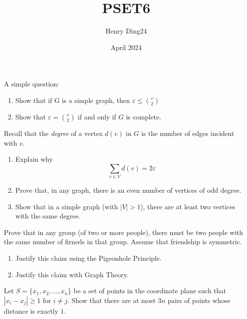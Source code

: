 \documentclass[12pt]{extarticle}
\title{PSET6}
\author{Henry Ding24}
\date{April 2024}
\begin{document}
\maketitle

\begin{prob}
	A simple question:
	\begin{enumerate}[label=(\alph*)]
		\item Show that if G is a simple graph, then $\varepsilon \leq \binom{v}{2}$
		\item Show that $\varepsilon = \binom{v}{2}$ if and only if $G$ is complete.
	\end{enumerate}
\end{prob}

\begin{prob}
	Recall that the \textit{degree} of a vertex $d(v)$ in $G$ is the number of edges incident with $v$.
	\begin{enumerate}[label=(\alph*)]
		\item Explain why \begin{equation}
			      \sum_{v\in V}d(v) = 2\varepsilon
		      \end{equation}
		\item Prove that, in any graph, there is an even number of vertices of odd degree.
		\item Show that in a simple graph (with $|V| > 1$), there are at least two vertices with the same degree.
	\end{enumerate}
\end{prob}

\begin{prob}
	Prove that in any group (of two or more people), there must be two people with the same number of firneds in that group. Assume that friendship is symmetric.
	\begin{enumerate}[label=(\alph*)]
		\item Justify this claim using the Pigeonhole Principle.
		\item Justify this claim with Graph Theory.
	\end{enumerate}
\end{prob}

\begin{prob}
	Let $S = \{x_1, x_2, \ldots, x_n\}$ be a set of points in the coordinate plane such that $|x_i - x_j| \geq 1$ for $i \neq j$. Show that there are at most $3n$ pairs of points whose distance is exactly $1$.
\end{prob}
\end{document}
